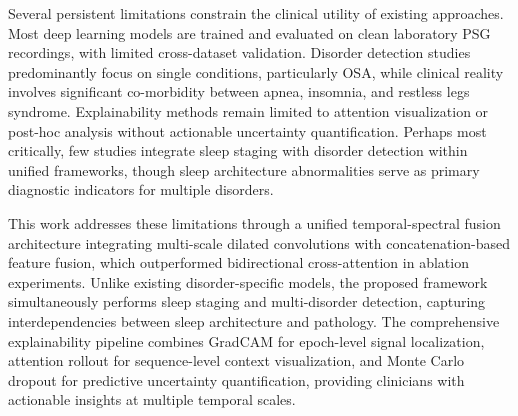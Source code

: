 \documentclass{ieeetj}
\begin{document}
Several persistent limitations constrain the clinical utility of existing approaches. Most deep learning models are trained and evaluated on clean laboratory PSG recordings, with limited cross-dataset validation. Disorder detection studies predominantly focus on single conditions, particularly OSA, while clinical reality involves significant co-morbidity between apnea, insomnia, and restless legs syndrome. Explainability methods remain limited to attention visualization or post-hoc analysis without actionable uncertainty quantification. Perhaps most critically, few studies integrate sleep staging with disorder detection within unified frameworks, though sleep architecture abnormalities serve as primary diagnostic indicators for multiple disorders.

This work addresses these limitations through a unified temporal-spectral fusion architecture integrating multi-scale dilated convolutions with concatenation-based feature fusion, which outperformed bidirectional cross-attention in ablation experiments. Unlike existing disorder-specific models, the proposed framework simultaneously performs sleep staging and multi-disorder detection, capturing interdependencies between sleep architecture and pathology. The comprehensive explainability pipeline combines GradCAM for epoch-level signal localization, attention rollout for sequence-level context visualization, and Monte Carlo dropout for predictive uncertainty quantification, providing clinicians with actionable insights at multiple temporal scales.

\end{document}
